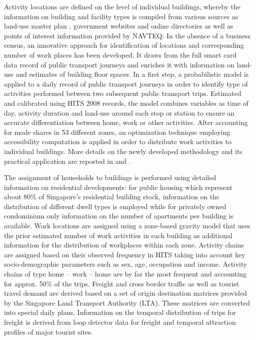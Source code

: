 Activity locations are defined on the level of individual buildings, whereby the information on building and facility types is compiled from various sources as land-use master plan \cite[][]{URA_Rep_URA_2008}, government websites and online directories as well as points of interest information provided by NAVTEQ. In the absence of a business census, an innovative approach for identification of locations and corresponding number of work places has been developed. It draws from the full smart card data record of public transport journeys and enriches it with information on land-use and estimates of building floor spaces. In a first step, a probabilistic model is applied to a daily record of public transport journeys in order to identify type of activities performed between two subsequent public transport trips. Estimated and calibrated using HITS 2008 records, the model combines variables as time of day, activity duration and land-use around each stop or station to ensure an accurate differentiation between home, work or other activities. After accounting for mode shares in 53 different zones, an optimization technique employing accessibility computation is applied in order to distribute work activities to individual buildings.  More details on the newly developed methodology and its practical application are reported in \citet[][]{ChakirovErath_IATBR_2012} and \citet[][]{OrdonezErath_TRR_2013}. 

The assignment of households to buildings is performed using detailed information on residential developments: for public housing which represent about 80\% of Singapore's residential building stock, information on the distribution of different dwell types is employed while for privately owned condominium only information on the number of apartments per building is available. Work locations are assigned using a zone-based gravity model that uses the prior estimated number of work activities in each building as additional information for the distribution of workplaces within each zone. Activity chains are assigned based on their observed frequency in HITS taking into account key socio-demographic parameters such as sex, age, occupation and income. Activity chains of type home – work – home are by far the most frequent and accounting for approx. 50\% of the trips.
Freight and cross border traffic as well as tourist travel demand are derived based on a set of origin destination matrices provided by the Singapore Land Transport Authority (LTA). These matrices are converted into special daily plans. Information on the temporal distribution of trips for freight is derived from loop detector data for freight and temporal attraction profiles of major tourist sites.

